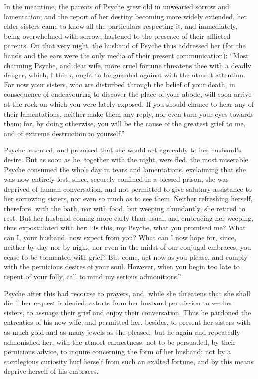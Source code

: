 \documentclass[12pt]{article}
\begin{document}
In the meantime, the parents of Psyche grew old in unwearied sorrow and
lamentation; and the report of her destiny becoming more widely extended, her
elder sisters came to know all the particulars respecting it, and immediately,
being overwhelmed with sorrow, hastened to the presence of their afflicted
parents. On that very night, the husband of Psyche thus addressed her (for the
hands and the ears were the only media of their present communication): ``Most
charming Psyche, and dear wife, more cruel fortune threatens thee with a deadly
danger, which, I think, ought to be guarded against with the utmost attention.
For now your sisters, who are disturbed through the belief of your death, in
consequence of endeavouring to discover the place of your abode, will soon
arrive at the rock on which you were lately exposed. If you should chance to
hear any of their lamentations, neither make them any reply, nor even turn your
eyes towards them; for, by doing otherwise, you will be the cause of the
greatest grief to me, and of extreme destruction to yourself.''

Psyche assented, and promised that she would act agreeably to her husband's
desire. But as soon as he, together with the night, were fled, the most
miserable Psyche consumed the whole day in tears and lamentations, exclaiming
that she was now entirely lost, since, securely confined in a blessed prison,
she was deprived of human conversation, and not permitted to give salutary
assistance to her sorrowing sisters, nor even so much as to see them. Neither
refreshing herself, therefore, with the bath, nor with food, but weeping
abundantly, she retired to rest. But her husband coming more early than usual,
and embracing her weeping, thus expostulated with her: ``Is this, my Psyche,
what you promised me? What can I, your husband, now expect from you? What can I
now hope for, since, neither by day nor by night, nor even in the midst of our
conjugal embraces, you cease to be tormented with grief? But come, act now as
you please, and comply with the pernicious desires of your soul. However, when
you begin too late to repent of your folly, call to mind my serious
admonitions.''

Psyche after this had recourse to prayers, and, while she threatens that she
shall die if her request is denied, extorts from her husband permission to see
her sisters, to assuage their grief and enjoy their conversation. Thus he
pardoned the entreaties of his new wife, and permitted her, besides, to present
her sisters with as much gold and as many jewels as she pleased; but he again
and repeatedly admonished her, with the utmost earnestness, not to be
persuaded, by their pernicious advice, to inquire concerning the form of her
husband; not by a sacrilegious curiosity hurl herself from such an exalted
fortune, and by this means deprive herself of his embraces.
\end{document}
